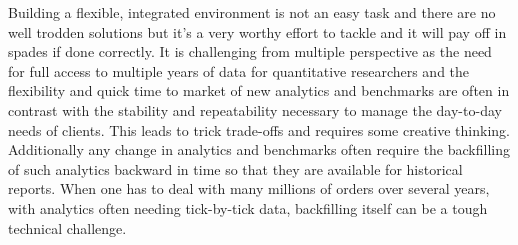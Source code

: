Building a flexible, integrated environment is not an easy task and there are no well trodden solutions but it's a very worthy effort to tackle and it will pay off in spades if done correctly. It is challenging from multiple perspective as the need for full access to multiple years of data  for quantitative researchers and the flexibility and quick time to market of new analytics and benchmarks are often in contrast with the stability and repeatability necessary to manage the day-to-day needs of clients. This leads to trick trade-offs and requires some creative thinking. \\ Additionally any change in analytics and benchmarks often require the backfilling of such analytics backward in time so that they are available for historical reports. When one has to deal with many millions of orders over several years, with analytics often needing tick-by-tick data, backfilling itself can be a tough technical challenge.


